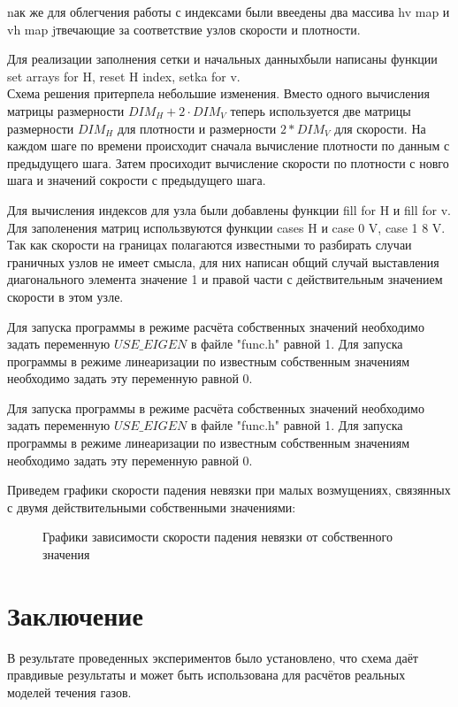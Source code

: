 \documentclass[a4paper, 25pt]{article}
\begin{document}
nак же для облегчения работы с индексами были ввеедены два массива hv map и vh map jтвечающие за соответствие узлов скорости и плотности.

Для реализации заполнения сетки и начальных данныхбыли написаны функции set arrays for H, reset H index, setka for v.\\
Схема решения притерпела небольшие изменения. Вместо одного вычисления матрицы размерности $DIM_H + 2 \cdot DIM_V$ теперь используется две матрицы размерности $DIM_H$ для плотности  и размерности $2 * DIM_V$ для скорости. На каждом шаге по времени происходит сначала вычисление плотности по данным с предыдущего шага. Затем просиходит вычисление скорости по плотности с новго шага и значений сокрости с предыдущего шага. 

Для вычисления индексов для узла были добавлены функции fill for H и fill for v.
Для заполенения матриц использвуются функции cases H и case 0 V, case 1 8 V. Так как скорости на границах полагаются известными то разбирать случаи граничных узлов не имеет смысла, для них написан общий случай выставления диагонального элемента значение 1 и правой части с действительным значением скорости в этом узле.

Для запуска программы в режиме расчёта собственных значений необходимо задать переменную $USE\_EIGEN$ в файле "func.h" равной 1. Для запуска программы
в режиме линеаризации по известным собственным значениям необходимо задать эту переменную равной 0.

Для запуска программы в режиме расчёта собственных значений необходимо задать переменную $USE\_EIGEN$ в файле "func.h" равной 1. Для запуска программы
в режиме линеаризации по известным собственным значениям необходимо задать эту переменную равной 0.

Приведем графики скорости падения невязки при малых возмущениях, связянных с двумя действительными собственными значениями:

\newpage

\begin{figure}
 \centering	
 \caption{Графики зависимости скорости падения невязки от собственного значения}
\end{figure} 

\section{Заключение}
В результате проведенных экспериментов было установлено, что схема даёт правдивые результаты и может быть использована для расчётов реальных моделей течения газов. 
\end{document}
